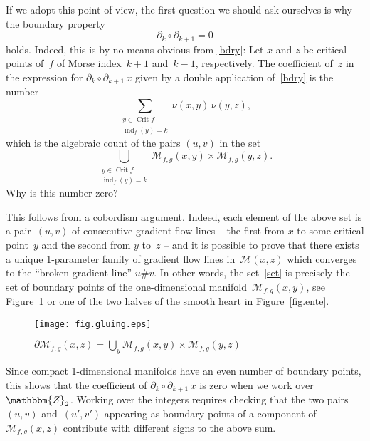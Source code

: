 \documentclass[12pt,twoside]{amsart}
\theoremstyle{plain}
\numberwithin{figure}{section}
\numberwithin{equation}{section}
\def\ind{\operatorname{ind}}
\def\Crit{\operatorname{Crit}}
\def\cm{{\mathcal M}}
\def\ZZ{\mathbbm{Z}}
\def\pp{\partial}
\begin{document}
If we adopt this point of view, the first question we should ask ourselves is why the boundary property 
\[
\partial_k \circ \partial_{k+1}=0
\]
holds. Indeed, this is by no means obvious from \eqref{bdry}: Let $x$ and $z$ be critical points of~$f$ 
of Morse index~$k+1$ and~$k-1$, respectively. The coefficient of~$z$ in the expression for 
$\partial_k \circ \partial_{k+1} \,x$ given by a double application of~\eqref{bdry} is the number
\[
\sum_{\substack{y\in \Crit f\\ \ind_f(y)=k}} \nu(x,y) \, \nu(y,z),
\]
which is the algebraic count of the pairs $(u,v)$ in the set
\begin{equation}
\label{set}
\bigcup_{\substack{y\in \Crit f\\ \ind_f(y)=k}} \mathcal{M}_{f,g}(x,y) \times \mathcal{M}_{f,g}(y,z).
\end{equation}
Why is this number zero?

This follows from a cobordism argument. Indeed, each element of the above set is a pair~$(u,v)$ of consecutive gradient flow lines -- the first from $x$ to some critical point~$y$ and the second from $y$ 
to~$z$ -- and it is possible to prove that there exists a unique 1-parameter family of gradient flow lines 
in~$\mathcal{M}(x,z)$ which converges to the ``broken gradient line'' $u\# v$. 
In other words, the set~\eqref{set} is precisely the set of boundary points of the one-dimensional 
manifold~$\mathcal{M}_{f,g}(x,y)$, see Figure~\ref{fig.gluing} or one of the two halves of the 
smooth heart in Figure~\ref{fig.ente}.
\begin{figure}[h]  
 \begin{center}
  \leavevmode\texttt{[image: fig.gluing.eps]}
 \end{center}
 \caption{$\pp \cm_{f,g}(x,z) = \bigcup_y \cm_{f,g}(x,y) \times \cm_{f,g}(y,z)$}
 \label{fig.gluing}
\end{figure}
Since compact 1-dimensional manifolds have an even number of 
boundary points, 
this shows that the coefficient of $\partial_k \circ \partial_{k+1} \,x$ is zero when 
we work over~$\ZZ_2$.
Working over the integers requires checking that the two pairs~$(u,v)$ and~$(u',v')$ appearing as boundary points of a component of~$\mathcal{M}_{f,g}(x,z)$ contribute with different signs to the above sum.
\end{document}
